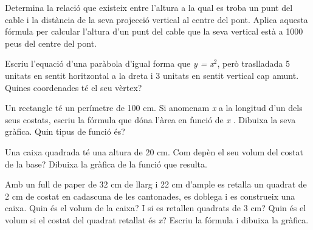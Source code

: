 \begin{mylist}
\begin{tasks} 
	\task  Determina la relació que existeix entre l'altura a la qual es troba un punt del cable i la distància de la seva projecció vertical al  centre del pont. 
	\task  Aplica aquesta fórmula per calcular l'altura d'un punt del cable que la seva vertical està a 1000 peus del centre del pont.
\end{tasks}

\answers{[Respecte el centre el pont $y=0.0001193 x^2$, 119.27 peus d'altura]}

\end{mylist}
 

\begin{mylist}
	
	\exer  Escriu l'equació d'una paràbola d'igual forma que \textit{y =} \textit{x}${}^{2}$, però traslladada 5 unitats en sentit horitzontal a la dreta i 3 unitats en sentit vertical cap amunt. Quines coordenades té el seu vèrtex?
	
	
	\exer  Un rectangle té un perímetre de 100 cm. Si anomenam \textit{x} a la longitud d'un dels seus costats, escriu la fórmula que dóna l'àrea en funció de \textit{x} . Dibuixa la seva gràfica. Quin tipus de funció és?
	
	
	\exer  Una caixa quadrada té una altura de 20 cm. Com depèn el seu volum del costat de la base? Dibuixa la gràfica de la funció que resulta.
	
	
	\exer  Amb un full de paper de 32 cm de llarg i 22 cm d'ample es retalla un quadrat de 2 cm de costat en cadascuna de les cantonades, es doblega i es construeix una caixa. Quin és el volum de la caixa? I si es retallen quadrats de 3 cm? Quin és el volum si el costat del quadrat retallat és\textit{ x}? Escriu la fórmula i dibuixa la gràfica.






\end{mylist}
 



